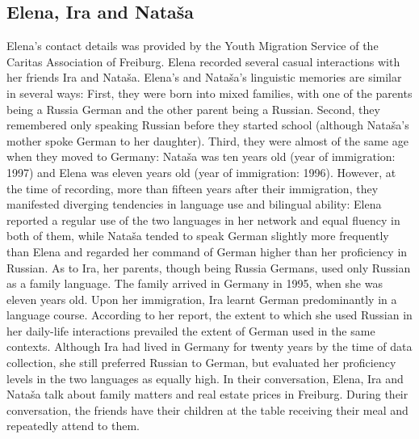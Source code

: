 \subsection{Elena, Ira and Nataša}
Elena's contact details was provided by the Youth Migration Service of the Caritas Association of Freiburg. Elena recorded several casual interactions with her friends Ira and Nataša. Elena's and Nataša's linguistic memories are similar in several ways: First, they were born into mixed families, with one of the parents being a Russia German and the other parent being a Russian. Second, they remembered only speaking Russian before they started school (although Nataša's mother spoke German to her daughter). Third, they were almost of the same age when they moved to Germany: Nataša was ten years old (year of immigration: 1997) and Elena was eleven years old (year of immigration: 1996). However, at the time of recording, more than fifteen years after their immigration, they manifested diverging tendencies in language use and bilingual ability: Elena reported a regular use of the two languages in her network and equal fluency in both of them, while Nataša tended to speak German slightly more frequently than Elena and regarded her command of German higher than her proficiency in Russian. As to Ira, her parents, though being Russia Germans, used only Russian as a family language. The family arrived in Germany in 1995, when she was eleven years old. Upon her immigration, Ira learnt German predominantly in a language course. According to her report, the extent to which she used Russian in her daily-life interactions prevailed the extent of German used in the same contexts. Although Ira had lived in Germany for twenty years  by the time of data collection, she still preferred Russian to German, but evaluated her proficiency levels in the two languages as equally high. In their conversation, Elena, Ira and Nataša talk about family matters and real estate prices in Freiburg. During their conversation, the friends have their children at the table receiving their meal and repeatedly attend to them.

